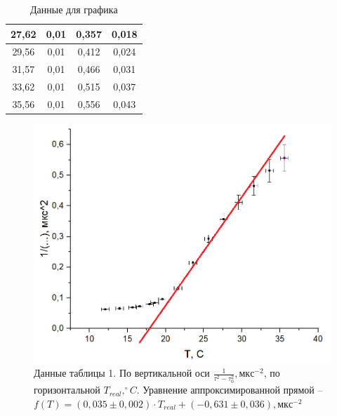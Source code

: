 \documentclass[a4paper, fontsize = 14pt]{article}
\begin{document}
\begin{table}[hbt]
\begin{tabular}{|c|c|c|c|}
27,62                           & 0,01                          & 0,357                                                      & 0,018                                                      \\ \hline
29,56                           & 0,01                          & 0,412                                                      & 0,024                                                      \\ \hline
31,57                           & 0,01                          & 0,466                                                      & 0,031                                                      \\ \hline
33,62                           & 0,01                          & 0,515                                                      & 0,037                                                      \\ \hline
35,56                           & 0,01                          & 0,556                                                      & 0,043                                                      \\ \hline
\end{tabular}
\caption{Данные для графика}
\end{table}

\begin{figure}[hbt]
    \centering
    \includegraphics[scale = 0.8]{lab324ris2.png}
    \caption{Данные таблицы 1. По вертикальной оси $\frac{1}{\tau^2-\tau_0^2}, мкс^{-2}$, по горизонтальной $T_{real}, ^\circ C$. Уравнение аппроксимированной прямой -- $f(T) = (0,035\pm0,002)\cdot T_{real} + (-0,631\pm0,036), мкс^{-2}$}
\end{figure}
\end{document}

